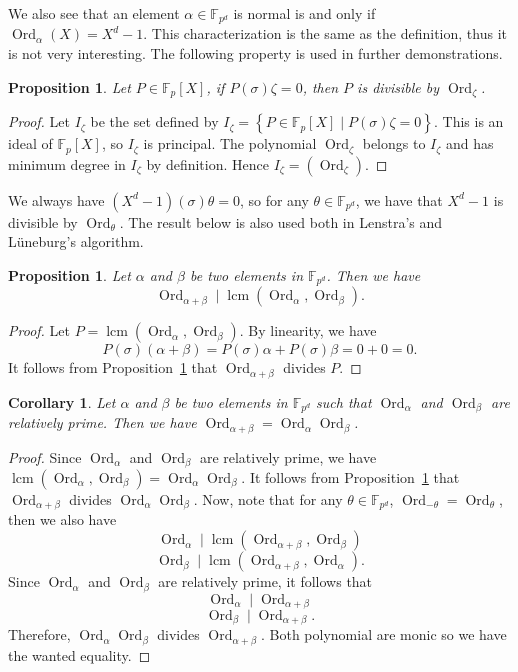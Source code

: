 \documentclass[a4paper,11pt]{article}
\theoremstyle{break}
\newtheorem{prop}[thm]{Proposition}
\newtheorem{cor}[thm]{Corollary}
\theoremstyle{sc}
\theoremstyle{definition}
\theoremstyle{remark}
\DeclareMathOperator{\Ord}{Ord}
\DeclareMathOperator{\lcm}{lcm}
\begin{document}
  
We also see that an element
$\alpha\in\mathbb{F}_{p^d}$ is normal is and only if
$\Ord_\alpha(X)=X^d-1$. This characterization is the same as the
definition, thus it is not very interesting. The following property is used in
further demonstrations.

\begin{prop}
  \label{orderDiv}
  Let $P\in\mathbb{F}_p[X]$, if $P(\sigma)\zeta=0$, then $P$ is divisible
  by $\Ord_{\zeta}$.
\end{prop}
\begin{proof}
  Let $I_\zeta$ be the set defined by $I_\zeta=\left\{P\in\mathbb{F}_p[X]\;|\; P(\sigma)\zeta
  = 0
\right\}$. This is an ideal of $\mathbb{F}_p[X]$, so $I_\zeta$ is principal. The
polynomial 
$\Ord_\zeta$ belongs to $I_\zeta$ and has minimum degree in $I_\zeta$ by definition.
Hence $I_\zeta=(\Ord_\zeta)$.
\end{proof}
We always have $(X^d-1)(\sigma)\theta=0$, so for any
$\theta\in\mathbb{F}_{p^d}$, we have that $X^d-1$ is divisible by
$\Ord_\theta$. The result below is also used both in Lenstra's and Lüneburg's
algorithm.
\begin{prop}
  \label{orderLcm}
  Let $\alpha$ and $\beta$ be two elements in $\mathbb{F}_{p^d}$. Then we
  have \[
    \Ord_{\alpha+\beta}\;|\;\lcm(\Ord_\alpha,\Ord_\beta).
  \]
\end{prop}
\begin{proof}
 Let $P=\lcm(\Ord_\alpha,\Ord_\beta)$. By linearity, we have
  \[
  P(\sigma)(\alpha+\beta)=P(\sigma)\alpha+P(\sigma)\beta=0+0=0.
\]
It follows from Proposition~\ref{orderDiv} that $\Ord_{\alpha+\beta}$ divides
$P$.
\end{proof}
\begin{cor}
  \label{orderMul}
  Let $\alpha$ and $\beta$ be two elements in $\mathbb{F}_{p^d}$ such that
  $\Ord_\alpha$ and $\Ord_\beta$ are relatively prime. Then we have
  $\Ord_{\alpha+\beta}=\Ord_\alpha\Ord_\beta$.
\end{cor}
\begin{proof}
  Since $\Ord_\alpha$ and $\Ord_\beta$ are relatively prime, we have
  $\lcm(\Ord_\alpha, \Ord_\beta)=\Ord_\alpha\Ord_\beta$. It follows from
  Proposition~\ref{orderLcm} that $\Ord_{\alpha+\beta}$ divides
  $\Ord_\alpha\Ord_\beta$. Now, note that for any
  $\theta\in\mathbb{F}_{p^d}$, $\Ord_{-\theta}=\Ord_\theta$, then we also have 
  \[
    \Ord_{\alpha}\;|\;\lcm(\Ord_{\alpha+\beta}, \Ord_\beta)
  \]
  \[
    \Ord_{\beta}\;|\;\lcm(\Ord_{\alpha+\beta}, \Ord_\alpha).
  \]
  Since $\Ord_\alpha$ and $\Ord_\beta$ are relatively prime, it follows
  that
  \[
    \Ord_{\alpha}\;|\;\Ord_{\alpha+\beta}
  \]
  \[
    \Ord_{\beta}\;|\;\Ord_{\alpha+\beta}.
  \]
  Therefore, $\Ord_\alpha\Ord_\beta$ divides $\Ord_{\alpha+\beta}$. Both
  polynomial are monic so we have the wanted equality.
\end{proof}
\end{document}
